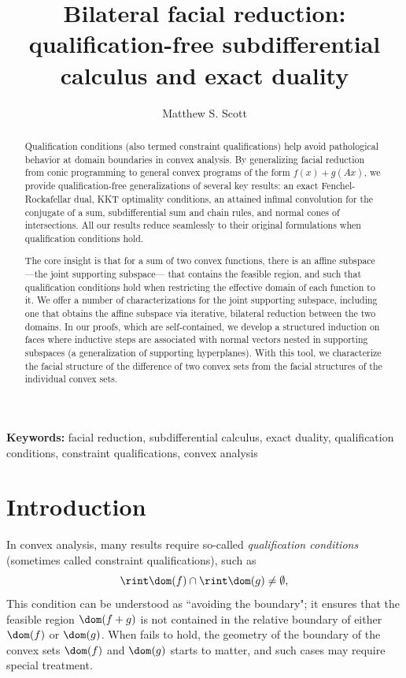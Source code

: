 \documentclass{article}
\title{Bilateral facial reduction: qualification-free subdifferential calculus and exact duality}
\author{Matthew S. Scott}
\theoremstyle{plain}
\theoremstyle{definition}
\theoremstyle{remark}
\begin{document}
\maketitle
\begin{abstract}
Qualification conditions (also termed constraint qualifications) help avoid pathological behavior at domain boundaries in convex analysis. By generalizing facial reduction from conic programming to general
convex programs of the
form $f(x) + g(Ax)$, we provide qualification-free
generalizations of several key results: an exact Fenchel-Rockafellar
dual, 
KKT optimality conditions, 
an attained infimal convolution for the conjugate of a sum,
subdifferential sum and chain rules, and normal cones of intersections.
All our results reduce seamlessly to their original formulations when qualification conditions hold.

The core insight is that for a sum of
two convex functions, there is an affine subspace---the joint supporting subspace---
that contains the feasible region, and such that qualification conditions
hold when restricting the effective domain of each function to it. We offer a number of characterizations for the joint supporting subspace, including 
one that obtains the affine subspace via iterative, bilateral reduction between the two domains.
In our proofs, which are self-contained, we develop
a structured induction on faces 
where inductive steps are associated with normal vectors nested in 
supporting subspaces (a generalization of supporting hyperplanes). 
With this tool, we characterize the facial structure of the difference of two convex
sets from the 
facial structures of the individual convex sets.
\end{abstract}
\noindent\textbf{Keywords:} facial reduction, subdifferential calculus, exact duality, qualification conditions, constraint qualifications, convex analysis
\section{Introduction}
\label{loc:body.introduction}
In convex analysis, many results require so-called \emph{qualification conditions}
(sometimes called constraint qualifications),
such as 
\begin{equation}
\label{eq:intro:ri}
\rint\dom(f) \cap \rint\dom(g) \neq \emptyset,
\end{equation}
This condition can be understood as ``avoiding the boundary"; it ensures that the feasible region $\dom(f + g)$ 
is not contained in the relative boundary of either $\dom(f)$ or $\dom(g)$. 
When  fails to hold, the geometry of the boundary
of the convex sets $\dom(f)$ and $\dom(g)$ starts to matter, and such cases may require
special treatment.
\end{document}
